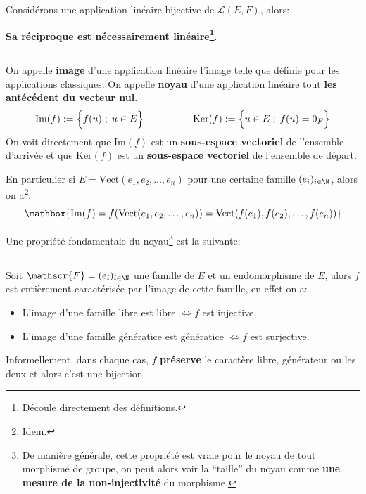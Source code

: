 Considérons une application linéaire bijective de \(\mathcal{L}(E, F)\), alors:
\begin{center}
   \textbf{Sa réciproque est nécessairement linéaire\footnote[3]{Découle directement des définitions.}}.
\end{center}

\subsection*{}

On appelle \textbf{image} d'une application linéaire l'image telle que définie pour les applications classiques.\+
On appelle \textbf{noyau} d'une application linéaire tout \textbf{les antécédent du vecteur nul}.\+
\[
   \text{Im}(f) := \Bigl\{ f(u) \; ; \; u \in E \Bigl\}
   \quad\quad\quad\quad\quad
   \text{Ker}(f) := \Bigl\{ u \in E \; ; \; f(u) = 0_F \Bigl\}
\]
On voit directement que \(\text{Im}(f)\) est un \textbf{sous-espace vectoriel} de l'ensemble d'arrivée et que \(\text{Ker}(f)\) est un \textbf{sous-espace vectoriel} de l'ensemble de départ.\<

En particulier si \(E = \text{Vect}(e_1, e_2, \ldots, e_n)\) pour une certaine famille \((e_i)_{i\in \N}\), alors on a\footnote[5]{Idem.}:
\[
      \mathbox{\text{Im}(f) = f(\text{Vect}(e_1, e_2, \ldots, e_n)) = \text{Vect}(f(e_1), f(e_2), \ldots, f(e_n))}
\]

Une propriété fondamentale du noyau\footnote[6]{De manière générale, cette propriété est vraie pour le noyau de tout morphisme de groupe, on peut alors voir la ``taille'' du noyau comme \textbf{une mesure de la non-injectivité} du morphisme.} est la suivante:
\begin{center}
\end{center}
\pagebreak

\subsection*{}

Soit \(\mathscr{F} = (e_i)_{i \in \N}\) une famille de \(E\) et un endomorphisme de \(E\), alors \(f\) est entièrement caractérisée par l'image de cette famille, en effet on a:
\begin{itemize}
   \item L'image d'une famille libre est libre \(\Longleftrightarrow f\) est injective.
   \item L'image d'une famille génératice est génératice \(\Longleftrightarrow f\) est surjective.      
\end{itemize}
Informellement, dans chaque cas, \(f\) \textbf{préserve} le caractère libre, générateur ou les deux et alors c'est une bijection.

